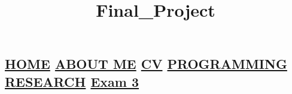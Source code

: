 \documentclass[
]{article}
\title{Final\_Project}
\author{}
\date{\vspace{-2.5em}}
\begin{document}
\maketitle

\hypertarget{home-about-me-cv-programming-research-exam-3}{%
\subsection{\texorpdfstring{\href{http://MurderousPolyhedron.github.io/}{HOME}
\textbar{} \href{http://MurderousPolyhedron.github.io/About_Me/}{ABOUT
ME} \textbar{} \href{http://MurderousPolyhedron.github.io/CV/}{CV}
\textbar{}
\href{http://MurderousPolyhedron.github.io/Programming/}{PROGRAMMING}
\textbar{}
\href{http://MurderousPolyhedron.github.io/Research/}{RESEARCH}
\textbar{} \href{http://MurderousPolyhedron.github.io/Exam_3/}{Exam
3}}{HOME \textbar{} ABOUT ME \textbar{} CV \textbar{} PROGRAMMING \textbar{} RESEARCH \textbar{} Exam 3}}\label{home-about-me-cv-programming-research-exam-3}}
\end{document}
